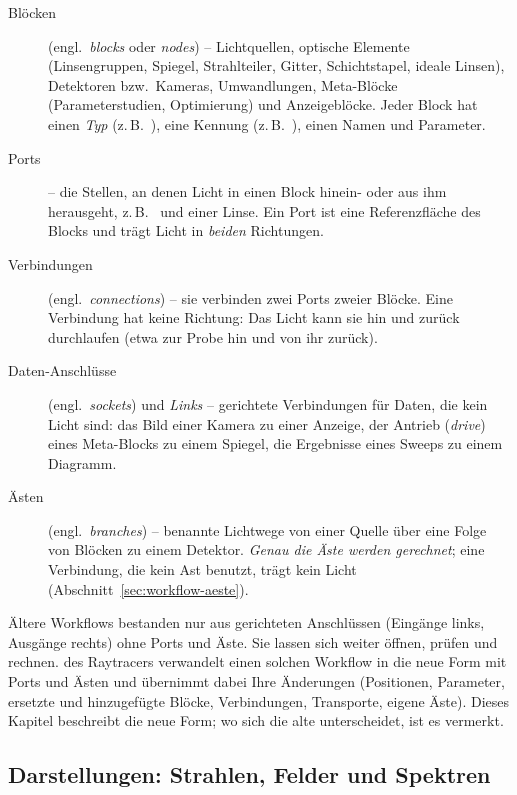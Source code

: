 \begin{description}
  \item[Blöcken] (engl.\ \emph{blocks} oder \emph{nodes}) – Lichtquellen, optische Elemente
        (Linsengruppen, Spiegel, Strahlteiler, Gitter, Schichtstapel, ideale Linsen),
        Detektoren bzw.\ Kameras, Umwandlungen, Meta-Blöcke (Parameterstudien, Optimierung)
        und Anzeigeblöcke. Jeder Block hat einen \emph{Typ} (z.\,B.\ ),
        eine Kennung (z.\,B.\ ), einen Namen und Parameter.
  \item[Ports] – die Stellen, an denen Licht in einen Block hinein- oder aus ihm herausgeht,
        z.\,B.\  und  einer Linse. Ein Port ist eine Referenzfläche des
        Blocks und trägt Licht in \emph{beiden} Richtungen.
  \item[Verbindungen] (engl.\ \emph{connections}) – sie verbinden zwei Ports zweier Blöcke.
        Eine Verbindung hat keine Richtung: Das Licht kann sie hin und zurück durchlaufen
        (etwa zur Probe hin und von ihr zurück).
  \item[Daten-Anschlüsse] (engl.\ \emph{sockets}) und \emph{Links} – gerichtete Verbindungen
        für Daten, die kein Licht sind: das Bild einer Kamera zu einer Anzeige, der Antrieb
        (\emph{drive}) eines Meta-Blocks zu einem Spiegel, die Ergebnisse eines Sweeps zu einem
        Diagramm.
  \item[Ästen] (engl.\ \emph{branches}) – benannte Lichtwege von einer Quelle über eine Folge
        von Blöcken zu einem Detektor. \emph{Genau die Äste werden gerechnet}; eine Verbindung,
        die kein Ast benutzt, trägt kein Licht (Abschnitt~\ref{sec:workflow-aeste}).
\end{description}

\begin{hinweis}
Ältere Workflows bestanden nur aus gerichteten Anschlüssen (Eingänge links, Ausgänge rechts)
ohne Ports und Äste. Sie lassen sich weiter öffnen, prüfen und rechnen.  des Raytracers verwandelt einen solchen Workflow in die neue Form mit Ports und Ästen und
übernimmt dabei Ihre Änderungen (Positionen, Parameter, ersetzte und hinzugefügte Blöcke,
Verbindungen, Transporte, eigene Äste). Dieses Kapitel beschreibt die neue Form; wo sich die alte
unterscheidet, ist es vermerkt.
\end{hinweis}

\subsection{Darstellungen: Strahlen, Felder und Spektren}\label{sec:workflow-darstellungen}

